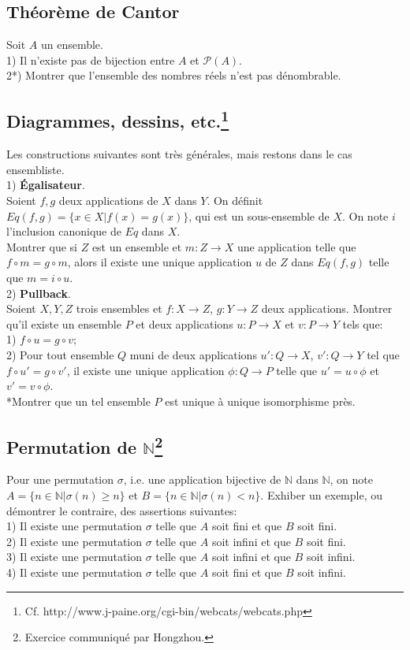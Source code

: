 \documentclass{article}
\begin{document}
\subsection{Th\'eor\`eme de Cantor}
Soit $A$ un ensemble.\\
1) Il n'existe pas de bijection entre $A$ et $\mathcal{P}(A)$.\\
2*) Montrer que l'ensemble des nombres r\'eels n'est pas d\'enombrable.

\subsection{Diagrammes, dessins, etc.\protect\footnote{Cf. http://www.j-paine.org/cgi-bin/webcats/webcats.php}}
Les constructions suivantes sont tr\`es g\'en\'erales, mais restons dans le cas ensembliste.\\
1) \textbf{\'Egalisateur}.\\
Soient $f,g$ deux applications de $X$ dans $Y$. On d\'efinit $Eq(f,g)=\{x\in X|f(x)=g(x)\}$, qui est un sous-ensemble de $X$. On note $i$ l'inclusion canonique de $Eq$ dans $X$.\\
Montrer que si $Z$ est un ensemble et $m:Z\to X$ une application telle que $f\circ m=g\circ m$, alors il existe une unique application $u$ de $Z$ dans $Eq(f,g)$ telle que $m=i\circ u$.\\
2) \textbf{Pullback}.\\
Soient $X,Y,Z$ trois ensembles et $f:X\to Z$, $g:Y\to Z$ deux applications. Montrer qu'il existe un ensemble $P$ et deux applications $u:P\to X$ et $v:P\to Y$ tels que:\\
1) $f\circ u=g\circ v$;\\
2) Pour tout ensemble $Q$ muni de deux applications $u':Q\to X$, $v':Q\to Y$ tel que $f\circ u'=g\circ v'$, il existe une unique application $\phi:Q\to P$ telle que $u'=u\circ\phi$ et $v'=v\circ\phi$.\\
*Montrer que un tel ensemble $P$ est unique \`a unique isomorphisme pr\`es.

\subsection{Permutation de $\mathbb{N}$\protect\footnote{Exercice communiqu\'e par Hongzhou.}}
Pour une permutation $\sigma$, i.e. une application bijective de $\mathbb{N}$ dans $\mathbb{N}$, on note $A=\{n\in\mathbb{N}|\sigma(n)\geq n\}$ et $B=\{n\in\mathbb{N}|\sigma(n)<n\}$. Exhiber un exemple, ou d\'emontrer le contraire, des assertions suivantes:\\
1) Il existe une permutation $\sigma$ telle que $A$ soit fini et que $B$ soit fini.\\
2) Il existe une permutation $\sigma$ telle que $A$ soit infini et que $B$ soit fini.\\
3) Il existe une permutation $\sigma$ telle que $A$ soit infini et que $B$ soit infini.\\
4) Il existe une permutation $\sigma$ telle que $A$ soit fini et que $B$ soit infini.
\end{document}
